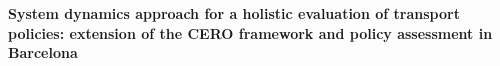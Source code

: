 \documentclass[a4paper,fontsize=10pt,bibliography=totoc]{scrartcl}
\newcommand{\titlemake}[1]{%
		\begin{center}
				\Large\sffamily\bfseries{#1}
		\end{center}
}
\newcommand{\subtitlemake}[1]{%
	\begin{center}
		\begingroup
			\large\sffamily{#1}
		\endgroup
	\end{center}
}
\begin{document}
\pagestyle{fancy}
\fancyhf{} %
\rhead{\footnotesize \today}
\rfoot{\footnotesize \thepage}

\titlemake{ %
System dynamics approach for a holistic evaluation of transport policies: extension of the CERO framework and policy assessment in Barcelona
}

\begin{multicols*}{2}
	
	\printbibliography
\end{multicols*}
\end{document}

